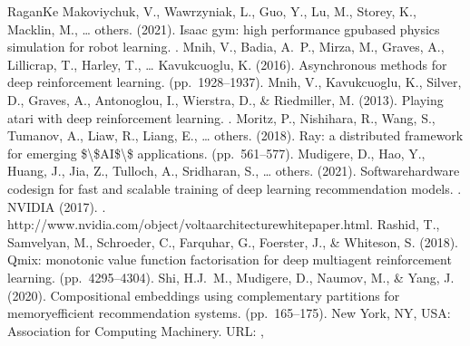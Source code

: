 \documentclass[letterpaper,10pt,english]{sphinxmanual}
\begin{document}
\begin{sphinxthebibliography}{Ragan\sphinxhyphen{}Ke}
\sphinxAtStartPar
Makoviychuk, V., Wawrzyniak, L., Guo, Y., Lu, M., Storey, K., Macklin, M., … others. (2021). Isaac gym: high performance gpu\sphinxhyphen{}based physics simulation for robot learning. .
\sphinxAtStartPar
Mnih, V., Badia, A. P., Mirza, M., Graves, A., Lillicrap, T., Harley, T., … Kavukcuoglu, K. (2016). Asynchronous methods for deep reinforcement learning.  (pp. 1928–1937).
\sphinxAtStartPar
Mnih, V., Kavukcuoglu, K., Silver, D., Graves, A., Antonoglou, I., Wierstra, D., \& Riedmiller, M. (2013). Playing atari with deep reinforcement learning. .
\sphinxAtStartPar
Moritz, P., Nishihara, R., Wang, S., Tumanov, A., Liaw, R., Liang, E., … others. (2018). Ray: a distributed framework for emerging \$\textbackslash{}\$AI\$\textbackslash{}\$ applications.  (pp. 561–577).
\sphinxAtStartPar
Mudigere, D., Hao, Y., Huang, J., Jia, Z., Tulloch, A., Sridharan, S., … others. (2021). Software\sphinxhyphen{}hardware co\sphinxhyphen{}design for fast and scalable training of deep learning recommendation models. .
\sphinxAtStartPar
NVIDIA (2017). . http://www.nvidia.com/object/volta\sphinxhyphen{}architecture\sphinxhyphen{}whitepaper.html.
\sphinxAtStartPar
Rashid, T., Samvelyan, M., Schroeder, C., Farquhar, G., Foerster, J., \& Whiteson, S. (2018). Qmix: monotonic value function factorisation for deep multi\sphinxhyphen{}agent reinforcement learning.  (pp. 4295–4304).
\sphinxAtStartPar
Shi, H.\sphinxhyphen{}J. M., Mudigere, D., Naumov, M., \& Yang, J. (2020). Compositional embeddings using complementary partitions for memory\sphinxhyphen{}efficient recommendation systems.  (pp. 165–175). New York, NY, USA: Association for Computing Machinery. URL: , %

\end{sphinxthebibliography}
\end{document}
